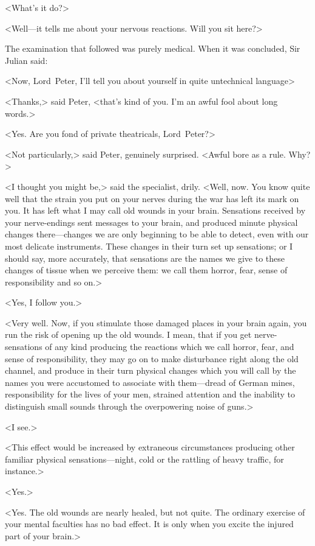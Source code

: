 <What's it do?>

<Well—it tells me about your nervous reactions. Will you sit here?>

The examination that followed was purely medical. When it was concluded, Sir Julian said:

<Now, Lord~Peter, I'll tell you about yourself in quite untechnical language\longdash>

<Thanks,> said Peter, <that's kind of you. I'm an awful fool about long words.>

<Yes. Are you fond of private theatricals, Lord~Peter?>

<Not particularly,> said Peter, genuinely surprised. <Awful bore as a rule. Why?>

<I thought you might be,> said the specialist, drily. <Well, now. You know quite well that the strain you put on your nerves during the war has left its mark on you. It has left what I may call old wounds in your brain. Sensations received by your nerve-endings sent messages to your brain, and produced minute physical changes there—changes we are only beginning to be able to detect, even with our most delicate instruments. These changes in their turn set up sensations; or I should say, more accurately, that sensations are the names we give to these changes of tissue when we perceive them: we call them horror, fear, sense of responsibility and so on.>

<Yes, I follow you.>

<Very well. Now, if you stimulate those damaged places in your brain again, you run the risk of opening up the old wounds. I mean, that if you get nerve-sensations of any kind producing the reactions which we call horror, fear, and sense of responsibility, they may go on to make disturbance right along the old channel, and produce in their turn physical changes which you will call by the names you were accustomed to associate with them—dread of German mines, responsibility for the lives of your men, strained attention and the inability to distinguish small sounds through the overpowering noise of guns.>

<I see.>

<This effect would be increased by extraneous circumstances producing other familiar physical sensations—night, cold or the rattling of heavy traffic, for instance.>

<Yes.>

<Yes. The old wounds are nearly healed, but not quite. The ordinary exercise of your mental faculties has no bad effect. It is only when you excite the injured part of your brain.>

